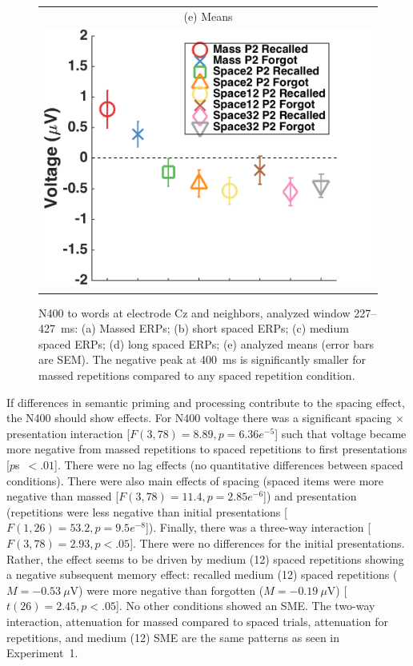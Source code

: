 \begin{figure}[hp]
\begin{tabular}{cc}
  \multicolumn{2}{c}{(e) Means} \\
  \multicolumn{2}{c}{\includegraphics[width=.35\textwidth]{./figs/exp2/tla_avg_ga_word_rc_mass_p2_word_fo_mass_p2_word_rc_spac2_p2_word_fo_spac2_p2_word_rc_spac12_p2_word_fo_spac12_p2_word_rc_spac32_p2_word_fo_spac32_p2_C_277_427_ylabel}} \\
  \end{tabular}
  \caption{N400 to words at electrode Cz and neighbors, analyzed window 227--427~ms: (a) Massed ERPs; (b) short spaced ERPs; (c) medium spaced ERPs; (d) long spaced ERPs; (e) analyzed means (error bars are SEM).  The negative peak at 400~ms is significantly smaller for massed repetitions compared to any spaced repetition condition.}
  \label{fig:s2_N400}
\end{figure}


If differences in semantic priming and processing contribute to the spacing effect, the N400 should show effects.
For N400 voltage there was a significant spacing $\times$ presentation interaction [$F(3,78)=8.89, p=6.36e^{-5}$] such that voltage became more negative from massed repetitions to spaced repetitions to first presentations [$p$s~$<.01$].  There were no lag effects (no quantitative differences between spaced conditions).  There were also main effects of spacing (spaced items were more negative than massed [$F(3,78)=11.4, p=2.85e^{-6}$]) and presentation (repetitions were less negative than initial presentations [$F(1,26)=53.2, p=9.5e^{-8}$]).  Finally, there was a three-way interaction [$F(3,78)=2.93, p<.05$].  There were no differences for the initial presentations.  Rather, the effect seems to be driven by medium (12) spaced repetitions showing a negative subsequent memory effect: recalled medium (12) spaced repetitions ($M=-0.53~\mu$V) were more negative than forgotten ($M=-0.19~\mu$V) [$t(26)=2.45, p<.05$].  No other conditions showed an SME.  
The two-way interaction, attenuation for massed compared to spaced trials, attenuation for repetitions, and medium (12) SME are the same patterns as seen in Experiment~1.


